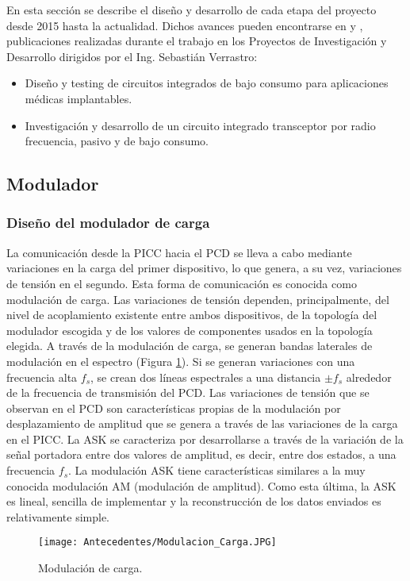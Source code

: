 En esta sección se describe el diseño y desarrollo de cada etapa del proyecto desde 2015 hasta la actualidad. Dichos avances pueden encontrarse en \cite{Proyecciones_0417} y \cite{Proyecciones_1017}, publicaciones realizadas durante el trabajo en los Proyectos de Investigación y Desarrollo dirigidos por el Ing. Sebastián Verrastro:
\begin{itemize}
\item Diseño y testing de circuitos integrados de bajo consumo para aplicaciones médicas implantables.
\item Investigación y desarrollo de un circuito 
integrado transceptor por radio frecuencia, 
pasivo y de bajo consumo.
\end{itemize}

\subsection{Modulador} \label{subsec:modulador}
\subsubsection{Diseño del modulador de carga}
La comunicación desde la PICC hacia el PCD se lleva a cabo mediante variaciones en la carga del primer dispositivo, lo que genera, a su vez, variaciones de tensión en el segundo. Esta forma de comunicación es conocida como modulación de carga. Las variaciones de tensión dependen, principalmente, del nivel de acoplamiento existente entre ambos dispositivos, de la topología del modulador escogida y de los valores de componentes usados en la topología elegida.
A través de la modulación de carga, se generan bandas laterales de modulación en el espectro (Figura \ref{fig:Mod_carg}). Si se generan variaciones con una frecuencia alta $f_s$, se crean dos líneas espectrales a una distancia $\pm f_s$ alrededor de la frecuencia de transmisión del PCD.
Las variaciones de tensión que se observan en el PCD son características propias de la modulación por desplazamiento de amplitud que se genera a través de las variaciones de la carga en el PICC. La ASK se caracteriza por desarrollarse a través de la variación de la señal portadora entre dos valores de amplitud, es decir, entre dos estados, a una frecuencia $f_s$. La modulación ASK tiene características similares a la muy conocida modulación AM (modulación de amplitud). Como esta última, la ASK es lineal, sencilla de implementar y la reconstrucción de los datos enviados es relativamente simple.

\begin{figure}[H]
\centering
\texttt{[image: Antecedentes/Modulacion\_Carga.JPG]}
\caption{Modulación de carga.}
\label{fig:Mod_carg}
\end{figure}


